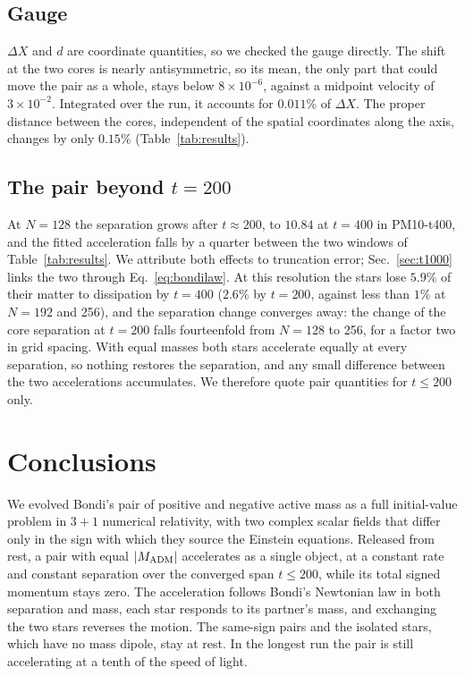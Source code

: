 \documentclass[twocolumn,floatfix,aps,prd,superscriptaddress,nofootinbib]{revtex4-2}
\begin{document}
\subsection{Gauge}

$\Delta X$ and $d$ are coordinate quantities, so we checked the gauge directly. The shift at the two cores is nearly antisymmetric, so its mean, the only part that could move the pair as a whole, stays below $8\times10^{-6}$, against a midpoint velocity of $3\times10^{-2}$. Integrated over the run, it accounts for $0.011\%$ of $\Delta X$. The proper distance between the cores, independent of the spatial coordinates along the axis, changes by only $0.15\%$ (Table~\ref{tab:results}).

\subsection{The pair beyond $t=200$}
\label{sec:latetime}

At $N=128$ the separation grows after $t\approx200$, to $10.84$ at $t=400$ in PM10-t400, and the fitted acceleration falls by a quarter between the two windows of Table~\ref{tab:results}. We attribute both effects to truncation error; Sec.~\ref{sec:t1000} links the two through Eq.~\eqref{eq:bondilaw}. At this resolution the stars lose $5.9\%$ of their matter to dissipation by $t=400$ ($2.6\%$ by $t=200$, against less than $1\%$ at $N=192$ and 256), and the separation change converges away: the change of the core separation at $t=200$ falls fourteenfold from $N=128$ to 256, for a factor two in grid spacing. With equal masses both stars accelerate equally at every separation, so nothing restores the separation, and any small difference between the two accelerations accumulates. We therefore quote pair quantities for $t\le200$ only.

\section{Conclusions}
\label{sec:discussion}

We evolved Bondi's pair of positive and negative active mass as a full initial-value problem in $3{+}1$ numerical relativity, with two complex scalar fields that differ only in the sign with which they source the Einstein equations. Released from rest, a pair with equal $|M_{\rm ADM}|$ accelerates as a single object, at a constant rate and constant separation over the converged span $t\le200$, while its total signed momentum stays zero. The acceleration follows Bondi's Newtonian law in both separation and mass, each star responds to its partner's mass, and exchanging the two stars reverses the motion. The same-sign pairs and the isolated stars, which have no mass dipole, stay at rest. In the longest run the pair is still accelerating at a tenth of the speed of light.
\end{document}
